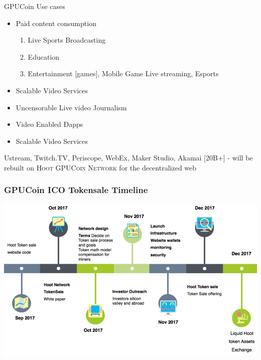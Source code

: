 \documentclass[10pt,handout]{beamer}
\begin{document}
\begin{frame}[fragile]{GPUCoin Use cases}
 \begin{itemize}[<+-| alert@+>]%
	 
\item {Paid content consumption}
\begin{enumerate}[<+-| alert@+>]
\item Live Sports Broadcasting
\item Education 
\item Entertainment [games], Mobile Game Live streaming, Esports
\end{enumerate}
\item {Scalable Video Services}
\item {Uncensorable Live video Journalism}
\item {Video Enabled Ðapps}
\item {Scalable Video Services}

\end{itemize}
\pause

\Large{
Ustream, Twitch.TV, Periscope, WebEx, Maker Studio, Akamai [20B+] - will be rebuilt on \textsc{Hoot GPUCoin Network} for the decentralized web
}

\end{frame}
\begin{frame}[t]\frametitle{GPUCoin ICO Tokensale Timeline}
     \includegraphics[width=1.0\textwidth]{static/tstimeline-trans}
\end{frame}
\end{document}
